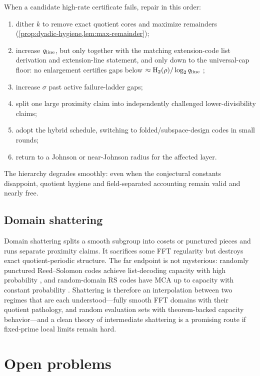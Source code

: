 \documentclass[11pt]{article}
\theoremstyle{definition}
\newcommand{\Hbin}{\operatorname{H}_2}
\newcommand{\qline}{q_{\rm line}}
\begin{document}
When a candidate high-rate certificate fails, repair in this order:
\begin{enumerate}[label=(\arabic*),leftmargin=2.2em]
\item dither $k$ to remove exact quotient cores and maximize remainders (\cref{prop:dyadic-hygiene,lem:max-remainder});
\item increase $\qline$, but only together with the matching extension-code list derivation and extension-line statement, and only down to the universal-cap floor: no enlargement certifies gaps below $\approx\Hbin(\rho)/\log_2\qline$ \cite{UniversalCap};
\item increase $\sigma$ past active failure-ladder gaps;
\item split one large proximity claim into independently challenged lower-divisibility claims;
\item adopt the hybrid schedule, switching to folded/subspace-design codes in small rounds;
\item return to a Johnson or near-Johnson radius for the affected layer.
\end{enumerate}
The hierarchy degrades smoothly: even when the conjectural constants disappoint, quotient hygiene and field-separated accounting remain valid and nearly free.

\subsection{Domain shattering}

Domain shattering splits a smooth subgroup into cosets or punctured pieces and runs separate proximity claims.  It sacrifices some FFT regularity but destroys exact quotient-periodic structure.  The far endpoint is not mysterious: randomly punctured Reed--Solomon codes achieve list-decoding capacity with high probability \cite{AGL24}, and random-domain RS codes have MCA up to capacity with constant probability \cite{GG25}.  Shattering is therefore an interpolation between two regimes that are each understood---fully smooth FFT domains with their quotient pathology, and random evaluation sets with theorem-backed capacity behavior---and a clean theory of intermediate shattering is a promising route if fixed-prime local limits remain hard.

\section{Open problems}
\label{sec:open}
\end{document}
